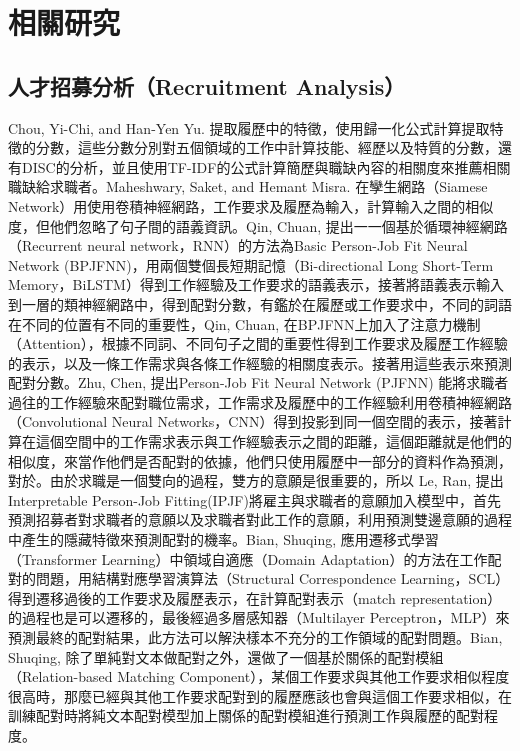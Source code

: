 
\chapter{相關研究}

\section{人才招募分析（Recruitment Analysis）}

Chou, Yi-Chi, and Han-Yen Yu. \cite{chou2020based} 提取履歷中的特徵，使用歸一化公式計算提取特徵的分數，這些分數分別對五個領域的工作中計算技能、經歷以及特質的分數，還有DISC的分析，並且使用TF-IDF的公式計算簡歷與職缺內容的相關度來推薦相關職缺給求職者。Maheshwary, Saket, and Hemant Misra. \cite{siamesematching} 在孿生網路（Siamese Network）用使用卷積神經網路，工作要求及履歷為輸入，計算輸入之間的相似度，但他們忽略了句子間的語義資訊。Qin, Chuan, \etal \cite{APJFNN} 提出一一個基於循環神經網路（Recurrent neural network，RNN）的方法為Basic Person-Job Fit Neural Network (BPJFNN)，用兩個雙個長短期記憶（Bi-directional Long Short-Term Memory，BiLSTM）得到工作經驗及工作要求的語義表示，接著將語義表示輸入到一層的類神經網路中，得到配對分數，有鑑於在履歷或工作要求中，不同的詞語在不同的位置有不同的重要性，Qin, Chuan, \etal \cite{APJFNN} 在BPJFNN上加入了注意力機制（Attention），根據不同詞、不同句子之間的重要性得到工作要求及履歷工作經驗的表示，以及一條工作需求與各條工作經驗的相關度表示。接著用這些表示來預測配對分數。Zhu, Chen, \etal \cite{PJFNN} 提出Person-Job Fit Neural Network (PJFNN) 能將求職者過往的工作經驗來配對職位需求，工作需求及履歷中的工作經驗利用卷積神經網路（Convolutional Neural Networks，CNN）得到投影到同一個空間的表示，接著計算在這個空間中的工作需求表示與工作經驗表示之間的距離，這個距離就是他們的相似度，來當作他們是否配對的依據，他們只使用履歷中一部分的資料作為預測，對於。由於求職是一個雙向的過程，雙方的意願是很重要的，所以 Le, Ran, \etal \cite{IPJF} 提出Interpretable Person-Job Fitting(IPJF)將雇主與求職者的意願加入模型中，首先預測招募者對求職者的意願以及求職者對此工作的意願，利用預測雙邊意願的過程中產生的隱藏特徵來預測配對的機率。Bian, Shuqing, \etal \cite{transferMathcing} 應用遷移式學習（Transformer Learning）中領域自適應（Domain Adaptation）的方法在工作配對的問題，用結構對應學習演算法（Structural Correspondence Learning，SCL）得到遷移過後的工作要求及履歷表示，在計算配對表示（match representation）的過程也是可以遷移的，最後經過多層感知器（Multilayer Perceptron，MLP）來預測最終的配對結果，此方法可以解決樣本不充分的工作領域的配對問題。Bian, Shuqing, \etal \cite{MultiVeiwMatching} 除了單純對文本做配對之外，還做了一個基於關係的配對模組（Relation-based Matching Component），某個工作要求與其他工作要求相似程度很高時，那麼已經與其他工作要求配對到的履歷應該也會與這個工作要求相似，在訓練配對時將純文本配對模型加上關係的配對模組進行預測工作與履歷的配對程度。

